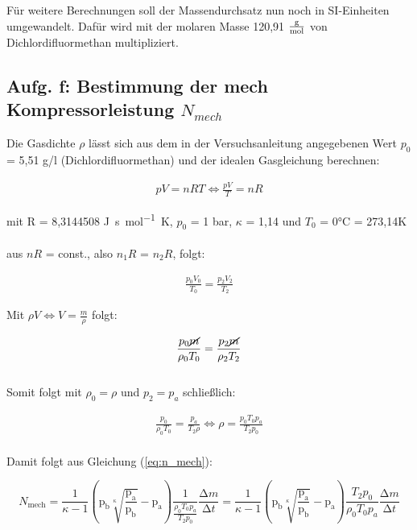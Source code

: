 {{Für weitere Berechnungen soll der Massendurchsatz nun noch in SI-Einheiten umgewandelt. Dafür wird mit der molaren Masse
120,91 $\unit[per-mode=fraction]{\gram\per\mol}$ von Dichlordifluormethan multipliziert. 

\subsection{Aufg. f: Bestimmung der mech Kompressorleistung $N_{mech}$}

Die Gasdichte $\rho$ lässt sich aus dem in der Versuchsanleitung \cite[7]{v206} angegebenen Wert 
$p_{0}$ = 5,51 g/l (Dichlordifluormethan) und der idealen Gasgleichung berechnen:

\begin{align*}
  pV = nRT \iff \frac{pV}{T} = nR
\end{align*}

mit R = 8,3144508 \unit[per-mode=fraction]{\joule\second\per\mol\kelvin}, $p_{0}$ = 1 bar, $\kappa$ = 1,14 und
$T_{0}$ = 0\unit{\celsius} = 273,14\unit{\kelvin}\\
\\
aus $nR$ = const., also $n_{1}R$ = $n_{2}R$, folgt:

\begin{align*}
  \frac{p_{0}V_{0}}{T_{0}} = \frac{p_{2}V_{2}}{T_{2}}
\end{align*}

Mit $\rho V \iff V = \frac{m}{\rho}$ folgt:

\begin{align*}
  \frac{p_{0}\cancel{m}}{\rho_{0}T_{0}} = \frac{p_{2}\cancel{m}}{\rho_{2}T_{2}}
\end{align*} \\

Somit folgt mit $\rho_{0} = \rho$ und $p_{2} = p_{a}$ schließlich:

\begin{align}
  \frac{p_{0}}{\rho_{0}T_{0}} = \frac{p_{a}}{T_{2}\rho} \iff \rho = \frac{p_{0}T_{0}p_{a}}{T_{2}p_{0}}
\end{align}\\

Damit folgt aus Gleichung (\ref{eq:n_mech}):

\begin{equation*}
  N_\text{mech} = 
  \frac{1}{\kappa - 1} 
  \left(\text{p}_\text{b} \sqrt[\kappa]{\frac {\text{p}_\text{a}} {\text{p}_\text{b}}} - \text{p}_\text{a} \right)
  \frac{1} {\frac {\rho_{0}T_{0}p_{a}} {T_{2}p_{0}}} \frac{\increment m}{\increment t} 
  =
  \frac{1}{\kappa - 1} 
  \left(\text{p}_\text{b} \sqrt[\kappa]{\frac {\text{p}_\text{a}} {\text{p}_\text{b}}} - \text{p}_\text{a} \right)
  \frac {T_{2}p_{0}} {\rho_{0}T_{0}p_{a}} \frac{\increment m}{\increment t}
\end{equation*} \\

}}
